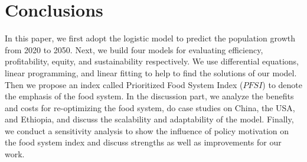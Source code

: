 \documentclass[12pt]{article}
\begin{document}
\section{Conclusions}

In this paper, we first adopt the logistic model to predict the population growth from 2020 to 2050. Next, we build four models for evaluating efficiency, profitability, equity, and sustainability respectively. We use differential equations, linear programming, and linear fitting to help to find the solutions of our model. Then we propose an index called Prioritized Food System Index ($PFSI$) to denote the emphasis of the food system. In the discussion part, we analyze the benefits and costs for re-optimizing the food system, do case studies on China, the USA, and Ethiopia, and discuss the scalability and adaptability of the model. Finally, we conduct a sensitivity analysis to show the influence of policy motivation on the food system index and discuss strengths as well as improvements for our work.




\end{document}
